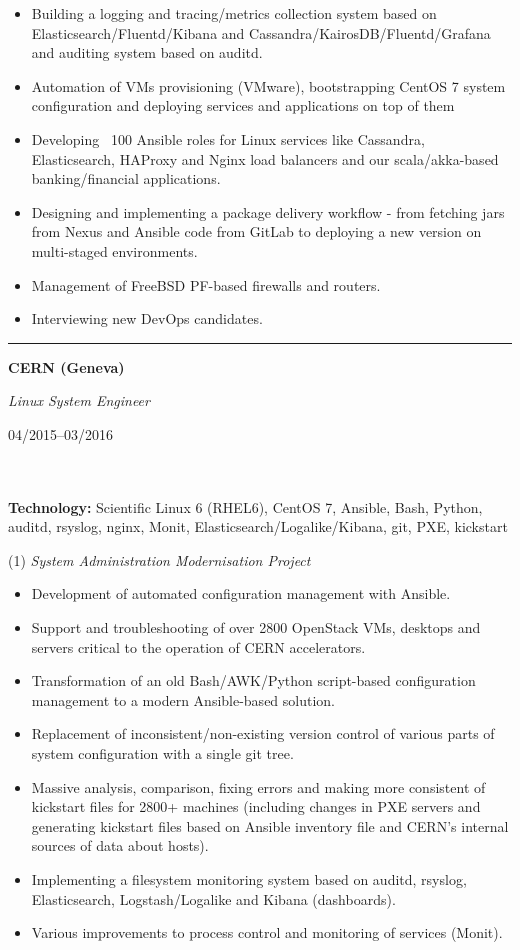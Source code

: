 \documentclass[$fontsize$, a4paper]{article}
\newcommand\textbox[1]{%
  \parbox{.333\textwidth}{#1}%
}
\begin{document}
\vspace{5pt}
\begin{itemize}
  \item Building a logging and tracing/metrics collection system based on Elasticsearch/Fluentd/Kibana and Cassandra/KairosDB/Fluentd/Grafana and auditing system based on auditd.
  \item Automation of VMs provisioning (VMware), bootstrapping CentOS 7 system configuration and deploying services and applications on top of them
  \item Developing ~100 Ansible roles for Linux services like Cassandra, Elasticsearch, HAProxy and Nginx load balancers and our scala/akka-based banking/financial applications.
  \item Designing and implementing a package delivery workflow - from fetching jars from Nexus and Ansible code from GitLab to deploying a new version on multi-staged environments.
  \item Management of FreeBSD PF-based firewalls and routers.
  \item Interviewing new DevOps candidates.
\end{itemize}


\noindent\rule[0.5ex]{\linewidth}{1pt}

\noindent\textbox{\textbf{\textsc{CERN} (Geneva)}\hfill}\textbox{\hfil \emph{Linux System Engineer}\hfil}\textbox{\hfill 04/2015--03/2016}\\\\
\textbf{Technology:} Scientific Linux 6 (RHEL6), CentOS 7, Ansible, Bash, Python, auditd, rsyslog, nginx, Monit, Elasticsearch/Logalike/Kibana, git, PXE, kickstart

\vspace{5pt}
(1) \emph{System Administration Modernisation Project}
\begin{itemize}
  \item Development of automated configuration management with Ansible.
  \item Support and troubleshooting of over 2800 OpenStack VMs, desktops and servers critical to the operation of CERN accelerators.
  \item Transformation of an old Bash/AWK/Python script-based configuration management to a modern Ansible-based solution.
  \item Replacement of inconsistent/non-existing version control of various parts of system configuration with a single git tree.
  \item Massive analysis, comparison, fixing errors and making more consistent of kickstart files for 2800+ machines (including changes in PXE servers and generating kickstart files based on Ansible inventory file and CERN's internal sources of data about hosts).
  \item Implementing a filesystem monitoring system based on auditd, rsyslog, Elasticsearch, Logstash/Logalike and Kibana (dashboards).
  \item Various improvements to process control and monitoring of services (Monit).
\end{itemize}
\end{document}
